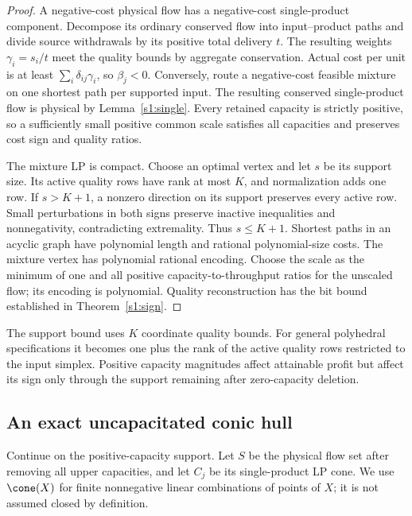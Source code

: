 \begin{proof}
A negative-cost physical flow has a negative-cost single-product
component. Decompose its ordinary conserved flow into input--product
paths and divide source withdrawals by its positive total delivery $t$.
The resulting weights $\gamma_i=s_i/t$ meet the quality bounds by
aggregate conservation. Actual cost per unit is at least
$\sum_i\delta_{ij}\gamma_i$, so $\beta_j<0$.
Conversely, route a negative-cost feasible mixture on one shortest path
per supported input. The resulting conserved single-product flow is
physical by Lemma~\ref{s1:single}. Every retained capacity is strictly
positive, so a sufficiently small positive common scale satisfies all
capacities and preserves cost sign and quality ratios.

The mixture LP is compact. Choose an optimal vertex and let $s$ be its
support size. Its active quality rows have rank at most $K$, and
normalization adds one row. If $s>K+1$, a nonzero direction on its
support preserves every active row. Small perturbations in both signs
preserve inactive inequalities and nonnegativity, contradicting
extremality. Thus $s\le K+1$. Shortest paths in an acyclic graph have
polynomial length and rational polynomial-size costs. The mixture
vertex has polynomial rational encoding. Choose the scale as the
minimum of one and all positive capacity-to-throughput ratios for the
unscaled flow; its encoding is polynomial. Quality reconstruction has
the bit bound established in Theorem~\ref{s1:sign}.
\end{proof}

The support bound uses $K$ coordinate quality bounds. For general
polyhedral specifications it becomes one plus the rank of the active
quality rows restricted to the input simplex. Positive capacity
magnitudes affect attainable profit but affect its sign only through
the support remaining after zero-capacity deletion.

\subsection{An exact uncapacitated conic hull}\label{s1:conic}

Continue on the positive-capacity support. Let $S$ be the physical flow
set after removing all upper capacities, and let $C_j$ be its
single-product LP cone. We use $\cone(X)$ for finite nonnegative linear
combinations of points of $X$; it is not assumed closed by definition.

